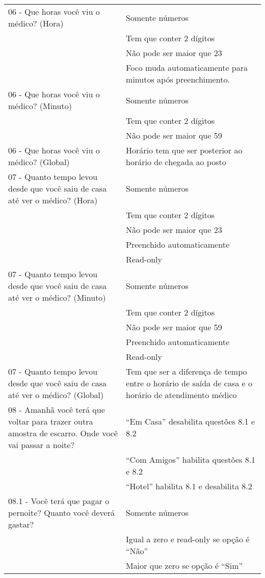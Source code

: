 \begin{longtable}{p{}|p{}}
06 - Que horas você viu o médico? (Hora) & Somente números \\ \cline{2-2}  & Tem que conter 2 dígitos \\ \cline{2-2} & Não pode ser maior que 23 \\ \cline{2-2} & Foco muda automaticamente para minutos após preenchimento.  \\ \hline
06 - Que horas você viu o médico? (Minuto) & Somente números \\ \cline{2-2}  & Tem que conter 2 dígitos \\ \cline{2-2} & Não pode ser maior que 59 \\ \hline
06 - Que horas você viu o médico? (Global) & Horário tem que ser posterior ao horário de chegada ao posto \\ \hline

07 - Quanto tempo levou desde que você saiu de casa até ver o médico? (Hora) & Somente números \\ \cline{2-2}  & Tem que conter 2 dígitos \\ \cline{2-2} & Não pode ser maior que 23 \\ \cline{2-2} & Preenchido automaticamente  \\ \cline{2-2} & Read-only\\ \hline
07 - Quanto tempo levou desde que você saiu de casa até ver o médico? (Minuto) & Somente números \\ \cline{2-2}  & Tem que conter 2 dígitos \\ \cline{2-2} & Não pode ser maior que 59 \\ \cline{2-2} & Preenchido automaticamente  \\ \cline{2-2} & Read-only \\ \hline
07 - Quanto tempo levou desde que você saiu de casa até ver o médico? (Global) & Tem que ser a diferença de tempo entre o horário de saída de casa e o horário de atendimento médico \\ \hline 

08 - Amanhã você terá que voltar para trazer outra amostra de escarro. Onde você vai passar a noite? & ``Em Casa'' desabilita questões 8.1 e 8.2 \\ \cline{2-2} & ``Com Amigos'' habilita questões 8.1 e 8.2 \\ \cline{2-2} & ``Hotel'' habilita 8.1 e desabilita 8.2 \\ \hline

08.1 - Você terá que pagar o pernoite? Quanto você deverá gastar? & Somente números \\ \cline{2-2} & Igual a zero e read-only se opção é ``Não'' \\ \cline{2-2} & Maior que zero se opção é ``Sim'' \\ \hline


\end{longtable}
